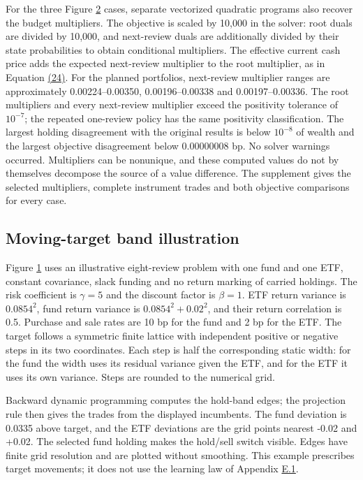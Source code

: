 \documentclass[11pt]{article}
\begin{document}
For the three Figure \hyperref[fig:2]{2} cases, separate vectorized quadratic programs also recover the budget multipliers. The objective is scaled by 10,000 in the solver: root duals are divided by 10,000, and next-review duals are additionally divided by their state probabilities to obtain conditional multipliers. The effective current cash price adds the expected next-review multiplier to the root multiplier, as in Equation \hyperref[eq:24]{(24)}. For the planned portfolios, next-review multiplier ranges are approximately 0.00224--0.00350, 0.00196--0.00338 and 0.00197--0.00336. The root multipliers and every next-review multiplier exceed the positivity tolerance of \(10^{-7}\); the repeated one-review policy has the same positivity classification. The largest holding disagreement with the original results is below \(10^{-8}\) of wealth and the largest objective disagreement below 0.00000008 bp. No solver warnings occurred. Multipliers can be nonunique, and these computed values do not by themselves decompose the source of a value difference. The supplement gives the selected multipliers, complete instrument trades and both objective comparisons for every case.

\subsection{Moving-target band illustration}\label{sec:C.3}

Figure \hyperref[fig:1]{1} uses an illustrative eight-review problem with one fund and one ETF, constant covariance, slack funding and no return marking of carried holdings. The risk coefficient is \(\gamma=5\) and the discount factor is \(\beta=1\). ETF return variance is \(0.0854^2\), fund return variance is \(0.0854^2+0.02^2\), and their return correlation is 0.5. Purchase and sale rates are 10 bp for the fund and 2 bp for the ETF. The target follows a symmetric finite lattice with independent positive or negative steps in its two coordinates. Each step is half the corresponding static width: for the fund the width uses its residual variance given the ETF, and for the ETF it uses its own variance. Steps are rounded to the numerical grid.

Backward dynamic programming computes the hold-band edges; the projection rule then gives the trades from the displayed incumbents. The fund deviation is 0.0335 above target, and the ETF deviations are the grid points nearest -0.02 and +0.02. The selected fund holding makes the hold/sell switch visible. Edges have finite grid resolution and are plotted without smoothing. This example prescribes target movements; it does not use the learning law of Appendix \hyperref[sec:E.1]{E.1}.
\end{document}
